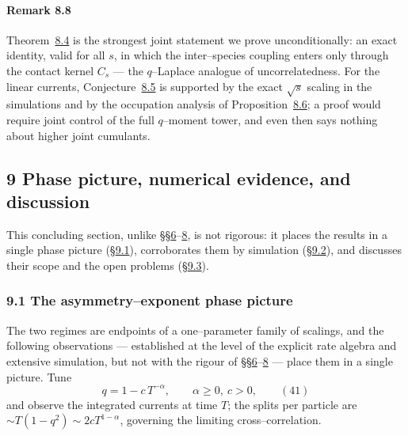 \documentclass[11pt]{article}
\theoremstyle{plain}
\theoremstyle{definition}
\theoremstyle{remark}
\begin{document}
\paragraph{Remark 8.8}\label{rem_uncorr}

Theorem~\hyperref[thm_cov]{8.4} is the strongest joint statement we prove unconditionally: an
exact identity, valid for all $s$, in which the inter--species coupling enters only
through the contact kernel $C_s$ --- the $q$--Laplace analogue of uncorrelatedness.
For the linear currents, Conjecture~\hyperref[conj_cov]{8.5} is supported by the exact
$\sqrt s$ scaling in the simulations and by the occupation analysis of
Proposition~\hyperref[prop_occ]{8.6}; a proof would require joint control of the full
$q$--moment tower, and even then says nothing about higher joint cumulants.
\par

\subsection{9 Phase picture, numerical evidence, and discussion}\label{sec_summary}

This concluding section, unlike \S\S\hyperref[sec_ew]{6}--\hyperref[sec_tw]{8}, is not rigorous: it
places the results in a single phase picture (\S\hyperref[sec_phase]{9.1}), corroborates them by
simulation (\S\hyperref[sec_numerics]{9.2}), and discusses their scope and the open problems
(\S\hyperref[sec_disc]{9.3}).

\subsubsection{9.1 The asymmetry--exponent phase picture}\label{sec_phase}

The two regimes are endpoints of a one--parameter family of scalings, and the
following observations --- established at the level of the explicit rate algebra and
extensive simulation, but not with the rigour of \S\S\hyperref[sec_ew]{6}--\hyperref[sec_tw]{8} --- place
them in a single picture. Tune
\label{eq_alpha}
\begin{equation}
  q=1-c\,T^{-\alpha},\qquad \alpha\ge0,\ c>0,\qquad(41)
\end{equation}
and observe the integrated currents at time $T$; the splits per particle are
$\sim T(1-q^2)\sim2cT^{1-\alpha}$, governing the limiting cross--correlation.
\end{document}

